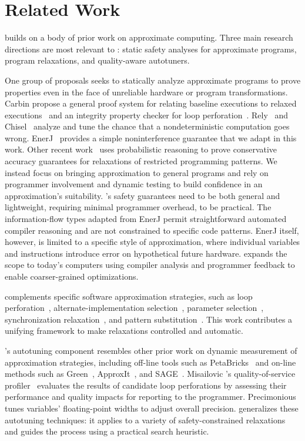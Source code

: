 \section{Related Work}
\label{accept:sec:related}

\sysname builds on a body of prior work on approximate
computing. Three main research directions are most
relevant to \sysname: static safety analyses for approximate programs,
program relaxations, and quality-aware autotuners.

One group of proposals seeks to statically analyze approximate programs to
prove properties even in the face of unreliable hardware or program
transformations.
Carbin \etal propose a general proof system for relating baseline executions
to relaxed executions~\cite{carbin-pldi}
and an integrity property checker for loop perforation~\cite{carbin-pepm}.
Rely~\cite{rely} and Chisel~\cite{chisel} analyze and tune the chance that a
nondeterministic computation goes wrong.
EnerJ~\cite{enerj} provides a simple noninterference guarantee that we adapt
in this work.
Other recent
work~\cite{sasa-sas11, zhu-popl12} uses probabilistic reasoning to prove
conservative accuracy guarantees for relaxations of restricted programming
patterns.
We instead focus on bringing approximation to general programs and rely on
programmer involvement and dynamic testing to build confidence in an
approximation's suitability.
\sysname's safety guarantees need to be both general and lightweight,
requiring minimal programmer overhead, to be practical. The information-flow
types adapted from EnerJ permit straightforward automated compiler
reasoning and are not constrained to specific code patterns.
%
EnerJ itself, however, is limited to a specific style of approximation, where
individual variables and instructions introduce error on hypothetical future
hardware.
\sysname expands the scope to today's computers using compiler analysis and
programmer feedback to enable coarser-grained optimizations.

\sysname complements specific software approximation strategies,
such as loop perforation~\cite{perforation},
alternate-implementation selection~\cite{petabricks, green, taco-soc}, parameter
selection~\cite{dynamicknobs}, synchronization relaxation~\cite{quickstep,
dubstep, races-ibm, rinard-hotpar}, and pattern
substitution~\cite{paraprox}. This work contributes a
unifying framework to make relaxations controlled and
automatic.

\sysname's autotuning component resembles other prior work on dynamic
measurement of approximation strategies, including off-line tools such as
PetaBricks~\cite{ansel-autotuning, petabricks} and on-line methods
such as Green~\cite{green}, ApproxIt~\cite{approxit}, and SAGE~\cite{sage}.
Misailovic
\etal's quality-of-service profiler~\cite{qosprof} evaluates the results of
candidate loop perforations by assessing their performance and quality impacts
for reporting to the programmer.
Precimonious~\cite{precimonious} tunes variables' floating-point widths to
adjust overall precision.
%
\sysname generalizes these autotuning
techniques: it applies to a variety of safety-constrained
relaxations and guides the process using a practical search
heuristic.

